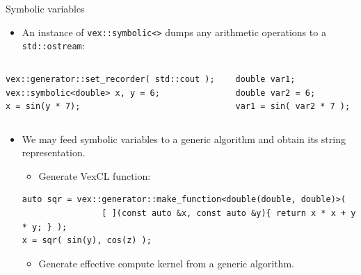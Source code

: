 \documentclass[@BEAMER_OPTIONS@]{beamer}
\newcommand{\code}[1]{\lstinline|#1|}
\begin{document}
\note{}

\begin{frame}[fragile]{Symbolic variables}
    \begin{itemize}
        \item An instance of \code{vex::symbolic<>} dumps any arithmetic
            operations to a \code{std::ostream}:
            \vspace{-0.5\baselineskip}
    \end{itemize}
    \begin{columns}
        \begin{column}{0.45\textwidth}
            \begin{exampleblock}{}
                \begin{lstlisting}
vex::generator::set_recorder( std::cout );
vex::symbolic<double> x, y = 6;
x = sin(y * 7);
                \end{lstlisting}
            \end{exampleblock}
        \end{column}
        \begin{column}{0.45\textwidth}
            \begin{exampleblock}{}
                \begin{verbatim}
double var1;
double var2 = 6;
var1 = sin( var2 * 7 );
                \end{verbatim}
            \end{exampleblock}
        \end{column}
    \end{columns}
    \vspace{\baselineskip}
    \begin{itemize}
        \item We may feed symbolic variables to a generic algorithm and obtain
            its string representation.
            \begin{itemize}
                \item Generate VexCL function:
            \end{itemize}
    \begin{exampleblock}{}
        \begin{lstlisting}
auto sqr = vex::generator::make_function<double(double, double)>(
                [ ](const auto &x, const auto &y){ return x * x + y * y; } );
x = sqr( sin(y), cos(z) );
        \end{lstlisting}
    \end{exampleblock}
    \begin{itemize}
        \item Generate effective compute kernel from a generic algorithm.
    \end{itemize}
    \end{itemize}
\end{frame}
\end{document}
